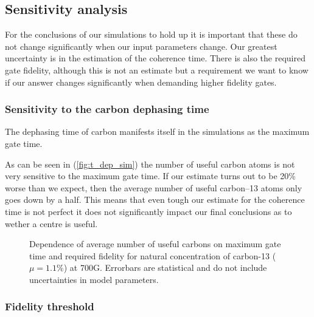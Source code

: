 \subsection{Sensitivity analysis}
\label{sensitivityanalysis}

For the conclusions of our simulations to hold up it is important that these do not change significantly when our input parameters change. Our greatest uncertainty is in the estimation of the coherence time. There is also the required gate fidelity, although this is not an estimate but a requirement we want to know if our answer changes significantly when demanding higher fidelity gates. 

\subsubsection{Sensitivity to the carbon dephasing time}
\label{sensitivitytothecarbondephasingtime}

The dephasing time of carbon manifests itself in the simulations as the maximum gate time. 

As can be seen in (\autoref{fig:t_dep_sim}) the number of useful carbon atoms is not very sensitive to the maximum gate time. If our estimate turns out to be 20\% worse than we expect, then the average number of useful carbon--13 atoms only goes down by a half. This means that even tough our estimate for the coherence time is not perfect it does not significantly impact our final conclusions as to wether a centre is useful. 


\begin{figure}
        \centering
 \caption{Dependence of average number of useful carbons on maximum gate time and required fidelity for natural concentration of carbon-13 ($\mu =1.1\%$) at 700G. Errorbars are statistical and do not include uncertainties in model parameters. }\label{fig:sensit}
\end{figure}


\subsubsection{Fidelity threshold}
\label{fidelitythreshold}

